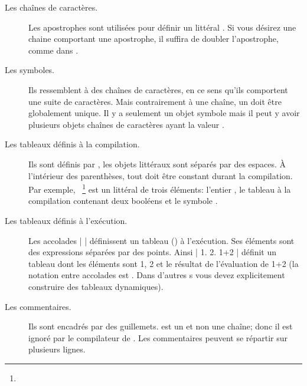 \documentclass[a4paper,10pt,twoside]{book}
\begin{document}
\begin{description}
\item[Les chaînes de caract\`{e}res.] Les apostrophes sont utilis\'{e}es pour d\'{e}finir un  litt\'{e}ral .
Si vous d\'{e}sirez une chaine comportant une apostrophe, il suffira de doubler l'apostrophe, comme dans .

\item[Les symboles.] Ils ressemblent \`a des chaînes de caract\`{e}res, en ce sens qu'ils comportent une suite de caract\`{e}res.  
Mais contrairement \`{a} une chaîne, un  doit \^{e}tre globalement unique.
Il y a seulement un objet symbole  mais il peut y avoir plusieurs objets chaînes de caract\`{e}res ayant la valeur .

\item[Les tableaux définis \`{a} la compilation.] Ils sont d\'{e}finis par \ct{#( )}, les objets litt\'{e}raux sont s\'{e}par\'{e}s par des espaces.
À l'int\'{e}rieur des parenth\`{e}ses, tout doit \^{e}tre constant durant la compilation.
Par exemple,  ~\footnote{} est un
 litt\'{e}ral de trois \'{e}l\'{e}ments: l'entier , le tableau \`{a} la compilation contenant deux bool\'{e}ens et le symbole .

\item[Les tableaux définis \`{a} l'ex\'{e}cution.] Les accolades \ct|{ }|
  d\'{e}finissent un tableau () \`{a} l'ex\'{e}cution.
Ses \'{e}l\'{e}ments sont des expressions s\'epar\'{e}es par des points.
Ainsi \ct|{ 1. 2. 1+2 }| d\'{e}finit un tableau dont les \'{e}l\'{e}ments sont 1, 2 et le r\'{e}sultat de l'\'{e}valuation de 1+2
(la notation entre accolades est . %
Dans d'autres \st{}s vous devez explicitement construire des tableaux dynamiques).

\item[Les commentaires.] Ils sont encadr\'{e}s par des guillemets.
 est un  et non une
chaîne; donc il est ignor\'{e} par le compilateur de \pharo.
Les commentaires peuvent se r\'{e}partir sur plusieurs lignes.
		

\end{description}
\end{document}

